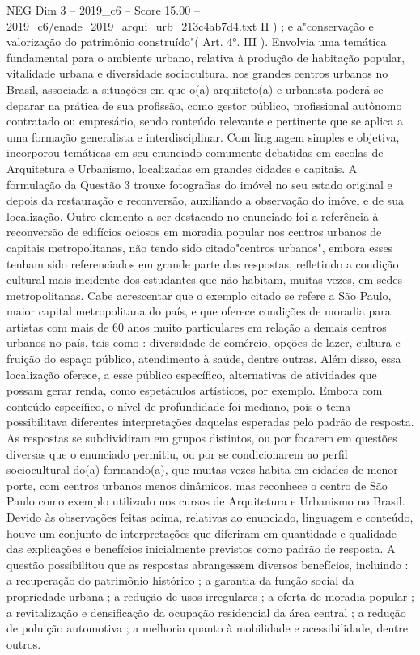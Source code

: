 \begin{textsample}{NEG Dim 3 – 2019\_c6 – Score 15.00 – 2019\_c6/enade\_2019\_arqui\_urb\_213c4ab7d4.txt}
II ) ; e a"conservação e valorização do patrimônio construído"( Art. 4{\EmojiFont °}.
III ).
Envolvia uma temática fundamental para o ambiente urbano, relativa à produção de habitação popular, vitalidade urbana e diversidade sociocultural nos grandes centros urbanos no Brasil, associada a situações em que o(a) arquiteto(a) e urbanista poderá se deparar na prática de sua profissão, como gestor público, profissional autônomo contratado ou empresário, sendo conteúdo relevante e pertinente que se aplica a uma formação generalista e interdisciplinar.
Com linguagem simples e objetiva, incorporou temáticas em seu enunciado comumente debatidas em escolas de Arquitetura e Urbanismo, localizadas em grandes cidades e capitais.
A formulação da Questão 3 trouxe fotografias do imóvel no seu estado original e depois da restauração e reconversão, auxiliando a observação do imóvel e de sua localização.
Outro elemento a ser destacado no enunciado foi a referência à reconversão de edifícios ociosos em moradia popular nos centros urbanos de capitais metropolitanas, não tendo sido citado"centros urbanos", embora esses tenham sido referenciados em grande parte das respostas, refletindo a condição cultural mais incidente dos estudantes que não habitam, muitas vezes, em sedes metropolitanas.
Cabe acrescentar que o exemplo citado se refere a São Paulo, maior capital metropolitana do país, e que oferece condições de moradia para artistas com mais de 60 anos muito particulares em relação a demais centros urbanos no país, tais como : diversidade de comércio, opções de lazer, cultura e fruição do espaço público, atendimento à saúde, dentre outras.
Além disso, essa localização oferece, a esse público específico, alternativas de atividades que possam gerar renda, como espetáculos artísticos, por exemplo.
Embora com conteúdo específico, o nível de profundidade foi mediano, pois o tema possibilitava diferentes interpretações daquelas esperadas pelo padrão de resposta.
As respostas se subdividiram em grupos distintos, ou por focarem em questões diversas que o enunciado permitiu, ou por se condicionarem ao perfil sociocultural do(a) formando(a), que muitas vezes habita em cidades de menor porte, com centros urbanos menos dinâmicos, mas reconhece o centro de São Paulo como exemplo utilizado nos cursos de Arquitetura e Urbanismo no Brasil.
Devido às observações feitas acima, relativas ao enunciado, linguagem e conteúdo, houve um conjunto de interpretações que diferiram em quantidade e qualidade das explicações e benefícios inicialmente previstos como padrão de resposta.
A questão possibilitou que as respostas abrangessem diversos benefícios, incluindo : a recuperação do patrimônio histórico ; a garantia da função social da propriedade urbana ; a redução de usos irregulares ; a oferta de moradia popular ; a revitalização e densificação da ocupação residencial da área central ; a redução de poluição automotiva ; a melhoria quanto à mobilidade e acessibilidade, dentre outros.

\end{textsample}
